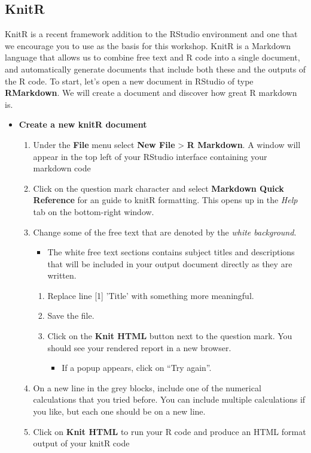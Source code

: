 \documentclass[a4paper]{book}
\providecommand{\tightlist}{%
  \setlength{\itemsep}{0pt}\setlength{\parskip}{0pt}}
\newenvironment{rmdblock}[1]
  {\vspace{1.5em}\begin{shaded*}
  \begin{itemize}
  \renewcommand{\labelitemi}{
    \raisebox{-.7\height}[0pt][0pt]{
      {\setkeys{Gin}{width=3em,keepaspectratio}\texttt{[image: images/\#1]}}
    }
  }
  \item
  }
  {
  \end{itemize}
  \end{shaded*}
  }
\newenvironment{rmdexercise}
  {\begin{rmdblock}{exercise}}
  {\end{rmdblock}}
\begin{document}
\subsection{KnitR}\label{knitr}

KnitR is a recent framework addition to the RStudio environment and one
that we encourage you to use as the basis for this workshop. KnitR is a
Markdown language that allows us to combine free text and R code into a
single document, and automatically generate documents that include both
these and the outputs of the R code. To start, let's open a new document
in RStudio of type \textbf{RMarkdown}. We will create a document and
discover how great R markdown is.

\begin{rmdexercise}
\textbf{Create a new knitR document}

\begin{enumerate}
\def\labelenumi{\arabic{enumi}.}
\item
  Under the \textbf{File} menu select \textbf{New File} \textgreater{}
  \textbf{R Markdown}. A window will appear in the top left of your
  RStudio interface containing your markdown code
\item
  Click on the question mark character and select \textbf{Markdown Quick
  Reference} for an guide to knitR formatting. This opens up in the
  \emph{Help} tab on the bottom-right window.
\item
  Change some of the free text that are denoted by the \emph{white
  background}.

  \begin{itemize}
  \tightlist
  \item
    The white free text sections contains subject titles and
    descriptions that will be included in your output document directly
    as they are written.
  \end{itemize}

  \begin{enumerate}
  \def\labelenumii{\alph{enumii})}
  \tightlist
  \item
    Replace line {[}1{]} 'Title' with something more meaningful.
  \item
    Save the file.
  \item
    Click on the \textbf{Knit HTML} button next to the question mark.
    You should see your rendered report in a new browser.

    \begin{itemize}
    \tightlist
    \item
      If a popup appears, click on ``Try again''.
    \end{itemize}
  \end{enumerate}
\item
  On a new line in the grey blocks, include one of the numerical
  calculations that you tried before. You can include multiple
  calculations if you like, but each one should be on a new line.
\item
  Click on \textbf{Knit HTML} to run your R code and produce an HTML
  format output of your knitR code
\end{enumerate}
\end{rmdexercise}
\end{document}
